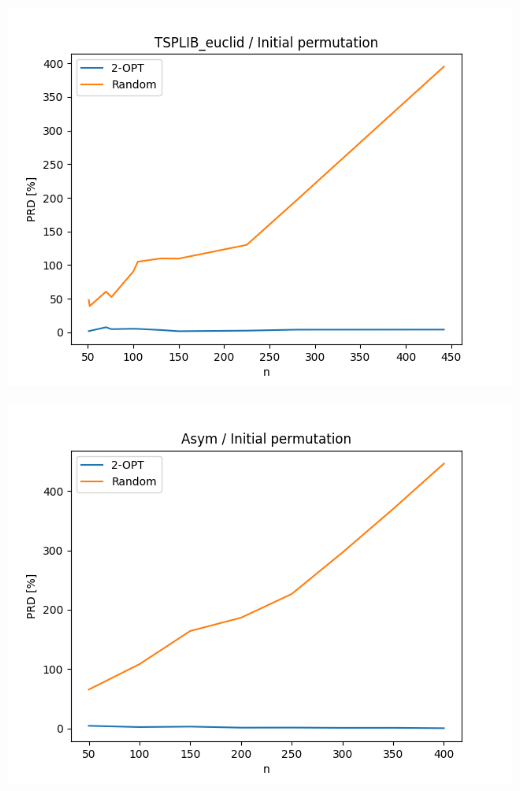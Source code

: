 \documentclass{article}
\begin{document}
\begin{center}
\includegraphics[width=\textwidth, 
                   height = 0.4\textheight, 
                   keepaspectratio]
                  {plots/tsplib_euclid_2_gen_rand} 
\end{center}

\begin{center}
\includegraphics[width=\textwidth, 
                   height = 0.4\textheight, 
                   keepaspectratio]
                  {plots/asym_2_gen_rand} 
\end{center}
\end{document}
